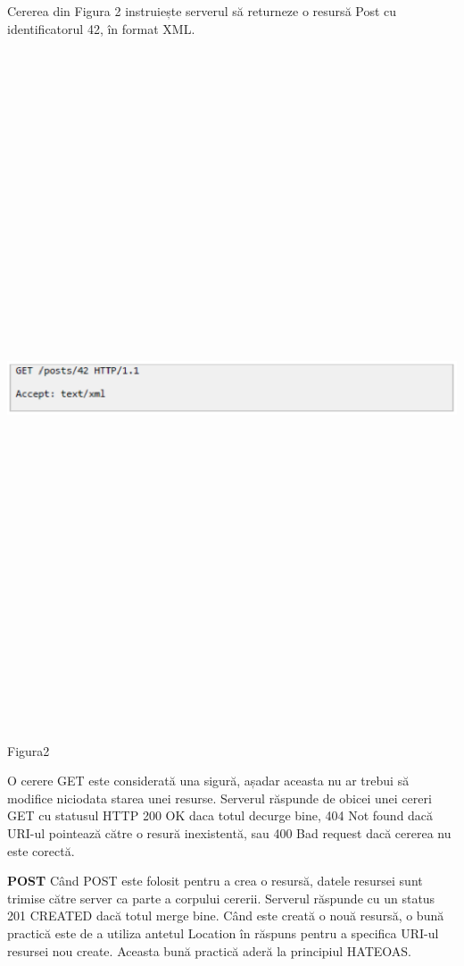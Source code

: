 Cererea din Figura 2 instruiește serverul să returneze o resursă Post cu identificatorul 42, în format XML.
\begin{center}
\includegraphics[width=15cm,height=20cm]{imagini/get2.eps} 
\caption{Figura2}
\end{center}

O cerere GET este considerată una sigură, așadar aceasta nu ar trebui să modifice niciodata starea unei resurse.
Serverul răspunde de obicei unei cereri GET cu statusul HTTP 200 OK daca totul decurge bine, 404 Not found dacă URI-ul  pointează către o resură inexistentă, sau 400 Bad request dacă cererea nu este corectă.

\textbf{POST}
Când POST este folosit pentru a crea o resursă, datele resursei sunt trimise către server ca parte a corpului cererii. Serverul răspunde cu un status 201 CREATED dacă totul merge bine. Când este creată o nouă resursă, o bună practică este de a utiliza antetul Location în răspuns pentru a specifica URI-ul resursei nou create. Aceasta bună practică aderă la principiul HATEOAS.

